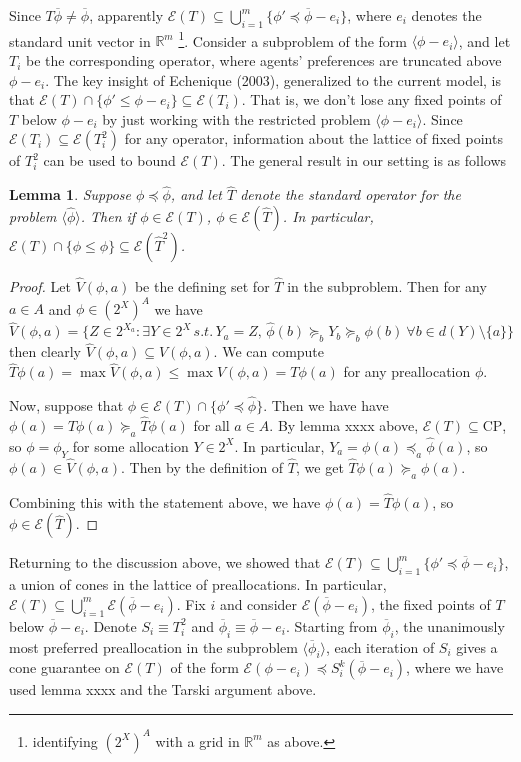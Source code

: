 \documentclass[11pt,reqno]{amsart}
\newtheorem{lemma}[thm]{Lemma}
\theoremstyle{definition}
\numberwithin{equation}{section}
\newcommand{\prf}{\begin{proof}}
\newcommand{\eprf}{\end{proof}}
\newcommand{\wh}{\widehat}
\newcommand{\mr}{\mathbb{R}}
\newcommand{\ol}{\overline}
\newcommand{\lag}{\langle}
\newcommand{\rag}{\rangle}
\newcommand{\pre}{\phi}
\newcommand{\coordpre}{\mathrm{CP}}
\newcommand{\prealloc}{(2^X)^A}
\newcommand{\sub}{\subseteq}
\newcommand{\fix}{\mathcal{E}}
\newcommand{\suq}{\succeq}
\newcommand{\peq}{\preceq}
\newcommand{\toppre}{\ol{\pre}}
\begin{document}
Since $T\toppre \not = \toppre$, apparently $\fix(T) \sub \bigcup_{i = 1}^m \{\pre' \peq \toppre - e_i\}$, where $e_i$ denotes the standard unit vector in $\mr^m$ \footnote{identifying $\prealloc$ with a grid in $\mr^m$ as above.}. 
Consider a subproblem of the form $\lag \pre - e_i \rag$, and let $T_i$ be the corresponding operator, where agents' preferences are truncated above $\pre - e_i$.
The key insight of Echenique (2003), generalized to the current model, is that $\fix(T) \cap \{\pre' \leq \pre - e_i\} \sub \fix(T_i)$.
That is, we don't lose any fixed points of $T$ below $\pre - e_i$ by just working with the restricted problem $\lag \pre - e_i \rag$. 
Since $\fix(T_i) \sub \fix(T_i^2)$ for any operator, information about the lattice of fixed points of $T_i^2$ can be used to bound $\fix(T)$.
The general result in our setting is as follows 
\begin{lemma}
Suppose $\pre \peq \wh{\pre}$, and let $\wh{T}$ denote the standard operator for the problem $\lag \wh{\pre} \rag$.
Then if $\pre \in \fix(T)$, $\pre \in \fix(\wh{T})$.
In particular, $\fix(T) \cap \{\pre \leq \wh{\pre}\} \sub \fix(\wh{T}^2)$. 
\end{lemma}
\prf
Let $\wh{V}(\pre, a)$ be the defining set for $\wh{T}$ in the subproblem.
Then for any $a \in A$ and $\pre \in \prealloc$ we have 
$\wh{V}(\pre,a)  = \{Z \in 2^{X_a}: \exists Y \in 2^X \, s.t. \,  Y_a = Z, \, \wh{\pre}(b) \suq_b Y_b \suq_b \pre(b) \: \forall b \in d(Y)\setminus\{a\} \}$
then clearly $\wh{V}(\pre,a) \sub V(\pre,a)$.  
We can compute $\wh{T}\pre(a) = \max \wh{V}(\pre,a) \leq \max V(\pre,a) = T\pre(a)$ for any preallocation $\pre$. 

Now, suppose that $\pre \in \fix(T)\cap\{\pre' \peq \wh{\pre}\}$.
Then we have have $\pre(a) = T\pre(a) \suq_a \wh{T}\pre(a)$ for all $a \in A$. 
By lemma xxxx above, $\fix(T) \sub \coordpre$, so $\pre = \pre_Y$ for some allocation $Y \in 2^X$.
In particular, $Y_a = \pre(a) \peq_a \wh{\pre}(a)$, so $\pre(a) \in \wh{V}(\pre,a)$.
Then by the definition of $\wh{T}$, we get $\wh{T}\pre(a) \suq_a \pre(a)$. 

Combining this with the statement above, we have $\pre(a) = \wh{T} \pre(a)$, so $\pre \in \fix(\wh{T})$. 
\eprf 
Returning to the discussion above, we showed that $\fix(T) \sub \bigcup_{i = 1}^m \{\pre' \peq \toppre - e_i\}$, a union of cones in the lattice of preallocations. 
In particular, $\fix(T) \sub \bigcup_{i = 1}^m \fix(\toppre - e_i)$.
Fix $i$ and consider $\fix(\toppre - e_i)$, the fixed points of $T$ below $\toppre - e_i$.
Denote $S_i \equiv T_i^2$ and $\toppre_i \equiv \toppre - e_i$.
Starting from $\toppre_i$, the unanimously most preferred preallocation in the subproblem $\lag \toppre_i \rag$, each iteration of $S_i$ gives a cone guarantee on $\fix(T)$ of the form $\fix(\pre - e_i) \peq S_i^k (\toppre - e_i)$, where we have used lemma xxxx and the Tarski argument above. 
\end{document}
